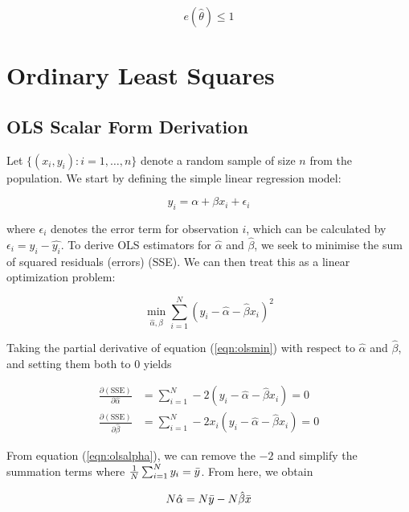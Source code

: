 \documentclass{article}
\begin{document}
\[
    e(\hat{\theta}) \leq 1
\]

\section{Ordinary Least Squares}

\subsection{OLS Scalar Form Derivation}

Let $\{(x_i, y_i): i= 1, \dots , n \}$ denote a random sample of size $n$ from the population. We start by defining the simple linear regression model: 

\begin{equation}
    y_i = \alpha + \beta x_i + \epsilon_i
\end{equation}

\noindent where $\epsilon_i$ denotes the error term for observation $i$, which can be calculated by $\epsilon_i = y_i - \hat{y_i}$. To derive OLS estimators for $\hat{\alpha}$ and $\hat{\beta}$, we seek to minimise the sum of squared residuals (errors) (SSE). We can then treat this as a linear optimization problem:

\begin{equation}\label{eqn:olsmin}
    \min_{\hat{\alpha},\hat{\beta}} \sum_{i=1}^N (y_i - \hat{\alpha} - \hat{\beta} x_i)^2
\end{equation}

\noindent Taking the partial derivative of equation (\ref{eqn:olsmin}) with respect to $\hat{\alpha}$ and $\hat{\beta}$, and setting them both to 0 yields 

\begin{align}\label{eqn:olsalpha}
    \frac{\partial{(\text{SSE})}}{\partial{\hat{\alpha}}} &= \sum_{i=1}^N -2(y_i - \hat{\alpha} - \hat{\beta} x_i) = 0 \\
    \frac{\partial{(\text{SSE})}}{\partial{\hat{\beta}}} &= \sum_{i=1}^N -2x_i(y_i - \hat{\alpha} - \hat{\beta} x_i) = 0 \label{eqn:olsbeta}
\end{align}

\noindent From equation (\ref{eqn:olsalpha}), we can remove the $-2$ and simplify the summation terms where $\frac{1}{N}\sum_{i=1}^N y_i = \Bar{y}$. From here, we obtain 

\begin{equation}
    N\hat{\alpha} = N\Bar{y} - N\hat{\beta}\Bar{x}
\end{equation}
\end{document}

